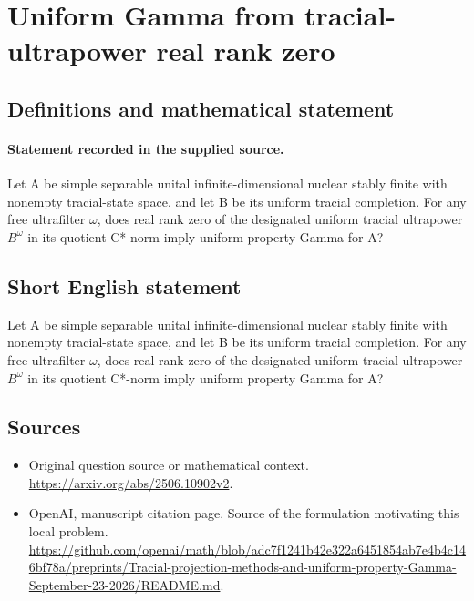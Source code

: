 \documentclass[11pt]{article}
\begin{document}
\section*{Uniform Gamma from tracial-ultrapower real rank zero}\label{statement}
\subsection{Definitions and mathematical statement}
\paragraph{Statement recorded in the supplied source.}
Let A be simple separable unital infinite-dimensional nuclear stably finite with nonempty tracial-state space, and let B be its uniform tracial completion. For any free ultrafilter $\omega $, does real rank zero of the designated uniform tracial ultrapower $B^\omega $ in its quotient C*-norm imply uniform property Gamma for A?
\subsection{Short English statement}
Let A be simple separable unital infinite-dimensional nuclear stably finite with nonempty tracial-state space, and let B be its uniform tracial completion. For any free ultrafilter $\omega $, does real rank zero of the designated uniform tracial ultrapower $B^\omega $ in its quotient C*-norm imply uniform property Gamma for A?
\subsection{Sources}
\begin{itemize}
\item[S1] Original question source or mathematical context.
\url{https://arxiv.org/abs/2506.10902v2}.
\item[S2] OpenAI, manuscript citation page. Source of the formulation motivating this local problem.
\url{https://github.com/openai/math/blob/adc7f1241b42e322a6451854ab7e4b4c146bf78a/preprints/Tracial-projection-methods-and-uniform-property-Gamma-September-23-2026/README.md}.
\end{itemize}
\end{document}

